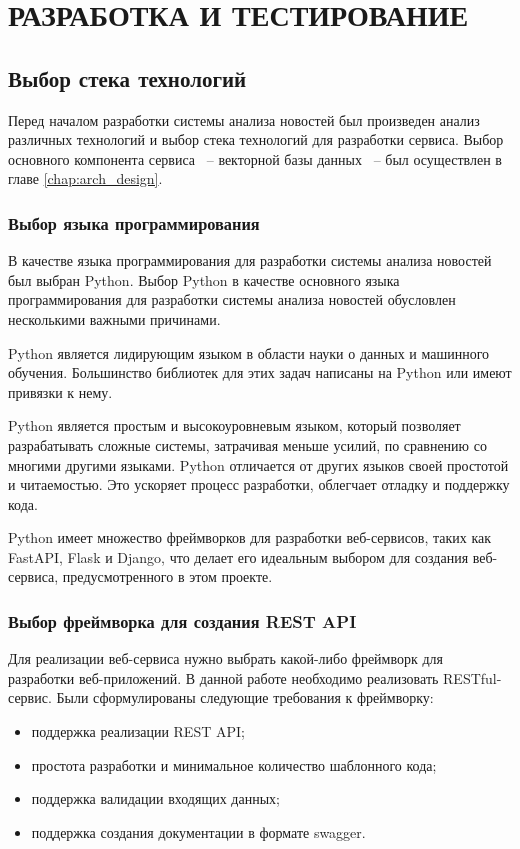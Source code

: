 \chapter{РАЗРАБОТКА И ТЕСТИРОВАНИЕ}
\aftertitle

\section{Выбор стека технологий}

Перед началом разработки системы анализа новостей был произведен анализ различных технологий и выбор стека технологий для разработки сервиса. Выбор основного компонента сервиса ~-- векторной базы данных ~-- был осуществлен в главе \ref{chap:arch_design}.

\subsection{Выбор языка программирования}

В качестве языка программирования для разработки системы анализа новостей был выбран Python. Выбор Python в качестве основного языка программирования для разработки системы анализа новостей обусловлен несколькими важными причинами.

Python является лидирующим языком в области науки о данных и машинного обучения. Большинство библиотек для этих задач написаны на Python или имеют привязки к нему.

Python является простым и высокоуровневым языком, который позволяет разрабатывать сложные системы, затрачивая меньше усилий, по сравнению со многими другими языками. Python отличается от других языков своей простотой и читаемостью. Это ускоряет процесс разработки, облегчает отладку и поддержку кода.

Python имеет множество фреймворков для разработки веб-сервисов, таких как FastAPI, Flask и Django, что делает его идеальным выбором для создания веб-сервиса, предусмотренного в этом проекте.

\subsection{Выбор фреймворка для создания REST API}

Для реализации веб-сервиса нужно выбрать какой-либо фреймворк для разработки веб-приложений. В данной работе необходимо реализовать RESTful-сервис. Были сформулированы следующие требования к фреймворку:
\begin{itemize}
    \item поддержка реализации REST API;
    \item простота разработки и минимальное количество шаблонного кода;
    \item поддержка валидации входящих данных;
    \item поддержка создания документации в формате swagger.
\end{itemize}


